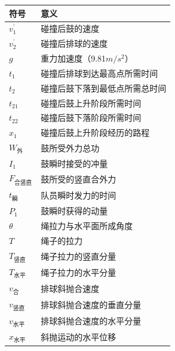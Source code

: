 \documentclass[UTF8]{article}
\begin{document}
\begin{center}
    \begin{table}[h]
        \centering
        \begin{tabular}{p{3cm}<{\centering}|p{7cm}<{\centering}} %
            \toprule 
            符号&意义\\
            \hline
            $v_1^{\mbox{'}}$&碰撞后鼓的速度\\
  
            \hline
            $v_2^{\mbox{'}}$&碰撞后排球的速度\\
            \hline  
            $g$&重力加速度（9.81$m/s^2$）\\
            \hline
            $t_1$&碰撞后排球到达最高点所需时间\\
            \hline
            $t_2$&碰撞后鼓下落到最低点所需总时间\\
            \hline
            $t_{21}$&碰撞后鼓上升阶段所需时间\\
            \hline
            $t_{22}$&碰撞后鼓下落阶段所需时间\\
            \hline
            $x_1$&碰撞后鼓上升阶段经历的路程\\
            \hline
            $W_{\mbox{外}}$&鼓所受外力总功\\
            \hline
            $I_1$&鼓瞬时接受的冲量\\
            \hline
            $F_{\mbox{合竖直}}$&鼓所受的竖直合外力\\
            \hline
            $t_{\mbox{瞬}}$&队员瞬时发力的时间\\
            \hline
            $P_1$&鼓瞬时获得的动量\\
            \hline
            $\theta$&绳拉力与水平面所成角度\\
            \hline
            $T$&绳子的拉力\\
            \hline
            $T_{\mbox{竖直}}$&绳子拉力的竖直分量\\
            \hline
            $T_{\mbox{水平}}$&绳子拉力的水平分量\\
            \hline
            $v_{\mbox{合}}$&排球斜抛合速度\\
            \hline
            $v_{\mbox{竖直}}$&排球斜抛合速度的垂直分量\\
            \hline
            $v_{\mbox{水平}}$&排球斜抛合速度的水平分量\\
            \hline
            $x_{\mbox{水平}}$&斜抛运动的水平位移\\

\end{tabular}
\end{table}
\end{center}
\end{document}
